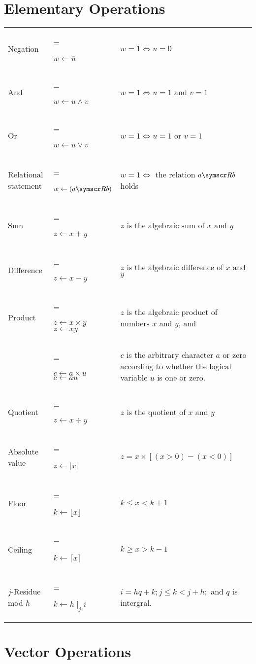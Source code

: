 \section{Elementary Operations}
\begin{tabularx}{\textwidth}{ l >{\hsize=0.5\hsize\linewidth=\hsize\raggedright\arraybackslash}X X }
	Negation
		& \( w \gets \bar{u} \)
		& \( w = 1 \iff u = 0 \)
		\\
	And
		& \( w \gets u \land v \)
		& \( w = 1 \iff u = 1 \) and \( v = 1 \)
		\\
	Or
		& \( w \gets u \lor v \)
		& \( w= 1 \iff u = 1 \) or \( v = 1 \)
		\\
	Relational statement
		& \( w \gets (a \relsym b) \)
		& \( w = 1 \iff \) the relation \( a \relsym b \) holds
		\\
	Sum
		& \( z \gets x + y \)
		& \( z \) is the algebraic sum of \( x \) and \( y \)
		\\
	Difference
		& \( z \gets x − y \)
		& \( z \) is the algebraic difference of \(x\) and \(y\)
		\\
	Product
		& \( z \gets x \times y \) \newline \( z \gets xy \)
		& \(z\) is the algebraic product of numbers \(x\) and \(y\), and
		\\
		& \( c \gets a \times u \) \newline \( c \gets au \)
		& \(c\) is the arbitrary character \(a\) or zero according to whether the logical variable \(u\) is one or zero.
		\\
	Quotient
		& \( z \gets x \div y \)
		& \(z\) is the quotient of \(x\) and \(y\)
		\\
	Absolute value
		& \( z \gets \lvert x \rvert \)
		& \( z = x \times [(x > 0) − (x < 0)] \)
		\\
	Floor
		& \( k \gets \lfloor x \rfloor \)
		& \( k \leq x < k + 1 \)
		\\
	Ceiling
		& \( k \gets \lceil x \rceil \)
		& \( k \geq x > k − 1 \)
		\\
	\( j \)-Residue mod \( h \)
		& \( k \gets h \mid_j i \)
		& \( i = hq + k; j \leq k < j + h;\) and \(q\) is intergral.
		\\
\end{tabularx}

\section{Vector Operations}


